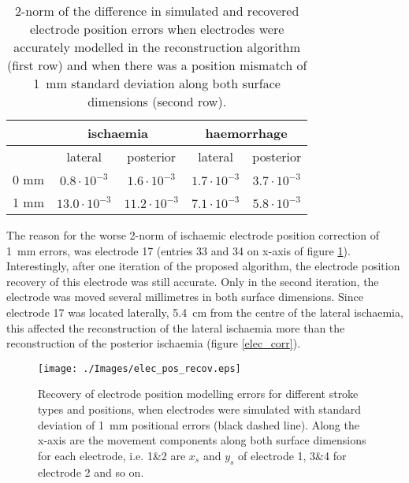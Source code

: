 \begin{table}[htbp]
\renewcommand{\arraystretch}{1.3}
  \centering
  \begin{tabular}{ccccc}
    \hline \hline
      & \multicolumn{2}{c}{ischaemia} & \multicolumn{2}{c}{haemorrhage} \\
    \hline
      & lateral & posterior & lateral & posterior \\ 
    \hline
     0 mm & $0.8\cdot10^{-3}$ & $1.6\cdot10^{-3}$ & $1.7\cdot10^{-3}$ & $3.7\cdot10^{-3}$ \\ 
     1 mm & $13.0\cdot10^{-3}$ & $11.2\cdot10^{-3}$ & $7.1\cdot10^{-3}$ & $5.8\cdot10^{-3}$ \\ 
    \hline \hline
  \end{tabular}
\caption{2-norm of the difference in simulated and recovered electrode position errors when electrodes were accurately modelled in the reconstruction algorithm (first row) and when there was a position mismatch of \SI{1}{\milli\metre} standard deviation along both surface dimensions (second row).}
\label{elec_pos_table}
\end{table}

The reason for the worse 2-norm of ischaemic electrode position correction of \SI{1}{\milli\metre} errors, was electrode 17 (entries 33 and 34 on x-axis of figure \ref{elec_pos_fig}). Interestingly, after one iteration of the proposed algorithm, the electrode position recovery of this electrode was still accurate. Only in the second iteration, the electrode was moved several millimetres in both surface dimensions. Since electrode 17 was located laterally, \SI{5.4}{\centi\metre} from the centre of the lateral ischaemia, this affected the reconstruction of the lateral ischaemia more than the reconstruction of the posterior ischaemia (figure \ref{elec_corr}).

\begin{figure}[htbp]	
\centering
\texttt{[image: ./Images/elec\_pos\_recov.eps]}
\caption{Recovery of electrode position modelling errors for different stroke types and positions, when electrodes were simulated with standard deviation of \SI{1}{\milli\metre} positional errors (black dashed line). Along the x-axis are the movement components along both surface dimensions for each electrode, i.e. 1\&2 are $x_s$ and $y_s$ of electrode 1, 3\&4 for electrode 2 and so on.}
\label{elec_pos_fig}
\end{figure}